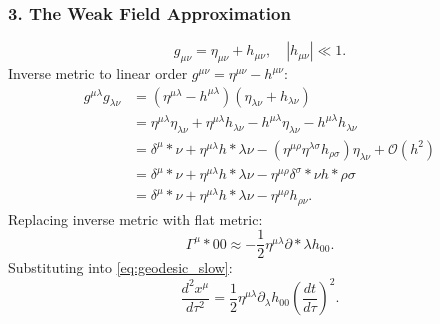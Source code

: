 \documentclass[11pt, a4paper]{report}
\begin{document}
\subsubsection*{3. The Weak Field Approximation}
\begin{equation}
g_{\mu\nu} = \eta_{\mu\nu} + h_{\mu\nu}, \quad |h_{\mu\nu}| \ll 1.
\end{equation}
Inverse metric to linear order $g^{\mu\nu} = \eta^{\mu\nu} - h^{\mu\nu}$:
\begin{align}
g^{\mu\lambda}g_{\lambda\nu} &= (\eta^{\mu\lambda} - h^{\mu\lambda})(\eta_{\lambda\nu} + h_{\lambda\nu}) \nonumber \\
&= \eta^{\mu\lambda}\eta_{\lambda\nu} + \eta^{\mu\lambda}h_{\lambda\nu} - h^{\mu\lambda}\eta_{\lambda\nu} - h^{\mu\lambda}h_{\lambda\nu} \nonumber \\
&= \delta^{\mu}*{\nu} + \eta^{\mu\lambda}h*{\lambda\nu} - (\eta^{\mu\rho}\eta^{\lambda\sigma}h_{\rho\sigma})\eta_{\lambda\nu} + \mathcal{O}(h^{2}) \nonumber \\
&= \delta^{\mu}*{\nu} + \eta^{\mu\lambda}h*{\lambda\nu} - \eta^{\mu\rho}\delta^{\sigma}*{\nu}h*{\rho\sigma} \nonumber \\
&= \delta^{\mu}*{\nu} + \eta^{\mu\lambda}h*{\lambda\nu} - \eta^{\mu\rho}h_{\rho\nu}.
\end{align}
Replacing inverse metric with flat metric:
\begin{equation}
\Gamma^{\mu}*{00} \approx -\frac{1}{2}\eta^{\mu\lambda}\partial*{\lambda}h_{00}.
\end{equation}
Substituting into \eqref{eq:geodesic_slow}:
\begin{equation}
\label{eq:geodesic_weak}
\frac{d^{2}x^{\mu}}{d\tau^{2}} = \frac{1}{2}\eta^{\mu\lambda}\partial_{\lambda}h_{00}\left(\frac{dt}{d\tau}\right)^{2}.
\end{equation}
\end{document}
